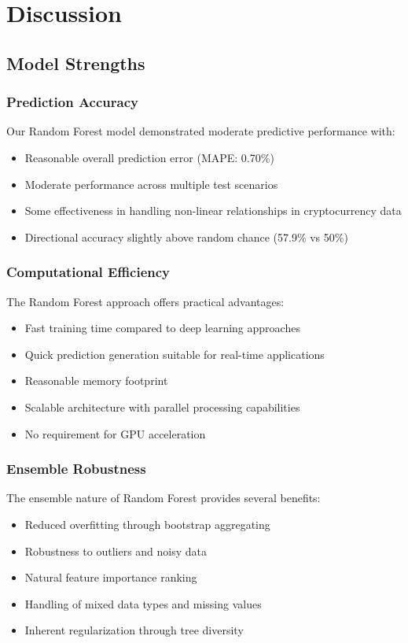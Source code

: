 \documentclass[11pt,a4paper]{article}
\begin{document}
\section{Discussion}

\subsection{Model Strengths}

\subsubsection{Prediction Accuracy}

Our Random Forest model demonstrated moderate predictive performance with:
\begin{itemize}
    \item Reasonable overall prediction error (MAPE: 0.70\%)
    \item Moderate performance across multiple test scenarios
    \item Some effectiveness in handling non-linear relationships in cryptocurrency data
    \item Directional accuracy slightly above random chance (57.9\% vs 50\%)
\end{itemize}

\subsubsection{Computational Efficiency}

The Random Forest approach offers practical advantages:
\begin{itemize}
    \item Fast training time compared to deep learning approaches
    \item Quick prediction generation suitable for real-time applications
    \item Reasonable memory footprint
    \item Scalable architecture with parallel processing capabilities
    \item No requirement for GPU acceleration
\end{itemize}

\subsubsection{Ensemble Robustness}

The ensemble nature of Random Forest provides several benefits:
\begin{itemize}
    \item Reduced overfitting through bootstrap aggregating
    \item Robustness to outliers and noisy data
    \item Natural feature importance ranking
    \item Handling of mixed data types and missing values
    \item Inherent regularization through tree diversity
\end{itemize}
\end{document}
